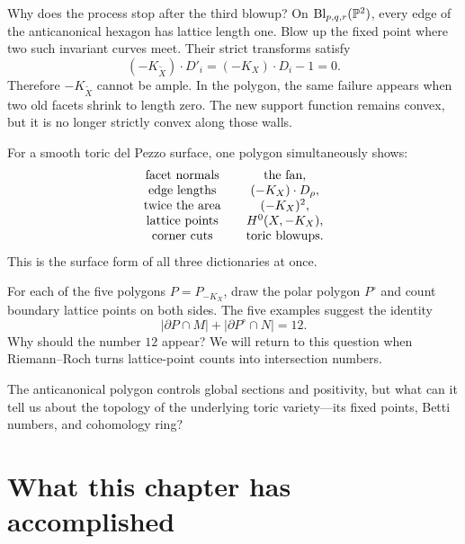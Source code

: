 Why does the process stop after the third blowup? On
\(\operatorname{Bl}_{p,q,r}(\mathbb{P}^2)\), every edge of the anticanonical hexagon has
lattice length one. Blow up the fixed point where two such invariant
curves meet. Their strict transforms satisfy
\[
(-K_{\widetilde X})\cdot D'_i
=
(-K_X)\cdot D_i-1
=
0.
\]
Therefore \(-K_{\widetilde X}\) cannot be ample. In the polygon, the
same failure appears when two old facets shrink to length zero. The
new support function remains convex, but it is no longer strictly
convex along those walls.

\begin{surfacelaboratory}
For a smooth toric del Pezzo surface, one polygon simultaneously shows:
\[
\begin{array}{c@{\qquad}c}
\text{facet normals} & \text{the fan},\\
\text{edge lengths} & (-K_X)\cdot D_\rho,\\
\text{twice the area} & (-K_X)^2,\\
\text{lattice points} & H^0(X,-K_X),\\
\text{corner cuts} & \text{toric blowups}.
\end{array}
\]
This is the surface form of all three dictionaries at once.
\end{surfacelaboratory}

\begin{prediction}
For each of the five polygons \(P=P_{-K_X}\), draw the polar polygon
\(P^\circ\) and count boundary lattice points on both sides. The five
examples suggest the identity
\[
|\partial P\cap M|
+
|\partial P^\circ\cap N|
=12.
\]
Why should the number \(12\) appear? We will return to this question
when Riemann--Roch turns lattice-point counts into intersection
numbers.
\end{prediction}

\begin{guidingquestion}
The anticanonical polygon controls global sections and positivity, but
what can it tell us about the topology of the underlying toric
variety---its fixed points, Betti numbers, and cohomology ring?
\end{guidingquestion}

\clearpage
\section*{What this chapter has accomplished}

